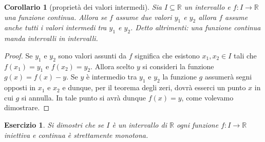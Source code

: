 \documentclass[italian,a4paper,oneside,headinclude]{scrbook}
\renewcommand{\subset}{\subseteq}
\newcommand{\RR}{\mathbb R}
\newtheorem{exercise}[theorem]{Esercizio}
\newtheorem{corollary}[theorem]{Corollario}
\begin{document}
\begin{corollary}[proprietà dei valori intermedi]
Sia $I\subset \RR$ un intervallo e $f\colon I \to \RR$ una
funzione continua.
Allora se $f$ assume due valori $y_1$ e $y_2$ allora $f$
assume anche tutti i valori intermedi tra $y_1$ e $y_2$.
Detto altrimenti: una funzione continua
manda intervalli in intervalli.
\end{corollary}
%
\begin{proof}
Se $y_1$ e $y_2$ sono valori assunti da $f$ significa
che esistono $x_1,x_2 \in I$ tali che $f(x_1)= y_1$ e $f(x_2)=y_2$.
Allora scelto $y$ si consideri la funzione $g(x) = f(x)-y$.
Se $y$ è intermedio tra $y_1$ e $y_2$ la funzione $g$ assumerà
segni opposti in $x_1$ e $x_2$ e dunque, per il teorema degli zeri,
dovrà esserci un punto $x$ in cui $g$ si annulla. In tale punto
si avrà dunque $f(x)=y$, come volevamo dimostrare.
\end{proof}

\begin{exercise}
Si dimostri che se $I$ è un intervallo di $\RR$ ogni funzione $f\colon I \to \RR$
iniettiva e continua è strettamente monotona.
\end{exercise}
\end{document}
